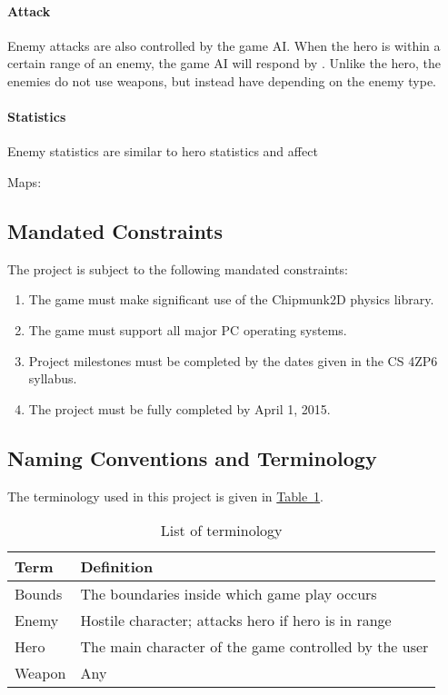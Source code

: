 \documentclass[12pt, titlepage]{article}
\begin{document}
\paragraph{Attack}
Enemy attacks are also controlled by the game AI.  When the hero is within a certain range of an enemy, the game AI will respond by .  Unlike the hero, the enemies do not use weapons, but instead have depending on the enemy type.

\paragraph{Statistics}
Enemy statistics are similar to hero statistics and affect

Maps:



\subsection{Mandated Constraints}

The project is subject to the following mandated constraints:

\begin{enumerate}
  \item The game must make significant use of the Chipmunk2D physics library.
  \item The game must support all major PC operating systems.
  \item Project milestones must be completed by the dates given in the CS 4ZP6 syllabus.
  \item The project must be fully completed by April 1, 2015.
\end{enumerate}

\subsection{Naming Conventions and Terminology}
The terminology used in this project is given in \hyperref[tab:terminology]{Table~\ref*{tab:terminology}}.
\begin{table}
\caption{List of terminology} \label{tab:terminology}
\begin{tabularx}{\textwidth}{p{3cm}X}
\toprule {\bf Term} & {\bf Definition}\\
\midrule
Bounds & The boundaries inside which game play occurs\\
Enemy & Hostile character; attacks hero if hero is in range\\
Hero & The main character of the game controlled by the user\\
Weapon & Any \\
\bottomrule
\end{tabularx}
\end{table}
\end{document}
